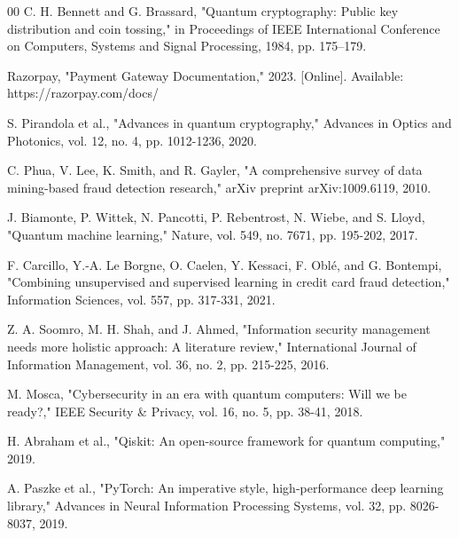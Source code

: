 \documentclass[onecolumn,a4paper,10pt]{IEEEtran}
\begin{document}

\begin{thebibliography}{00}
 C. H. Bennett and G. Brassard, "Quantum cryptography: Public key distribution and coin tossing," in Proceedings of IEEE International Conference on Computers, Systems and Signal Processing, 1984, pp. 175–179.

 Razorpay, "Payment Gateway Documentation," 2023. [Online]. Available: https://razorpay.com/docs/

 S. Pirandola et al., "Advances in quantum cryptography," Advances in Optics and Photonics, vol. 12, no. 4, pp. 1012-1236, 2020.

 C. Phua, V. Lee, K. Smith, and R. Gayler, "A comprehensive survey of data mining-based fraud detection research," arXiv preprint arXiv:1009.6119, 2010.

 J. Biamonte, P. Wittek, N. Pancotti, P. Rebentrost, N. Wiebe, and S. Lloyd, "Quantum machine learning," Nature, vol. 549, no. 7671, pp. 195-202, 2017.

 F. Carcillo, Y.-A. Le Borgne, O. Caelen, Y. Kessaci, F. Oblé, and G. Bontempi, "Combining unsupervised and supervised learning in credit card fraud detection," Information Sciences, vol. 557, pp. 317-331, 2021.

 Z. A. Soomro, M. H. Shah, and J. Ahmed, "Information security management needs more holistic approach: A literature review," International Journal of Information Management, vol. 36, no. 2, pp. 215-225, 2016.

 M. Mosca, "Cybersecurity in an era with quantum computers: Will we be ready?," IEEE Security \& Privacy, vol. 16, no. 5, pp. 38-41, 2018.

 H. Abraham et al., "Qiskit: An open-source framework for quantum computing," 2019.

 A. Paszke et al., "PyTorch: An imperative style, high-performance deep learning library," Advances in Neural Information Processing Systems, vol. 32, pp. 8026-8037, 2019.
\end{thebibliography}
\end{document}

